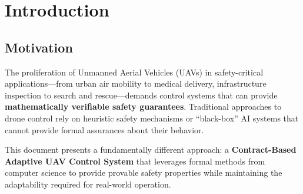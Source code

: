 
\chapter{Introduction}
\label{ch:introduction}

\section{Motivation}

The proliferation of Unmanned Aerial Vehicles (UAVs) in safety-critical applications---from urban air mobility to medical delivery, infrastructure inspection to search and rescue---demands control systems that can provide \textbf{mathematically verifiable safety guarantees}. Traditional approaches to drone control rely on heuristic safety mechanisms or ``black-box'' AI systems that cannot provide formal assurances about their behavior.

This document presents a fundamentally different approach: a \textbf{Contract-Based Adaptive UAV Control System} that leverages formal methods from computer science to provide provable safety properties while maintaining the adaptability required for real-world operation.

